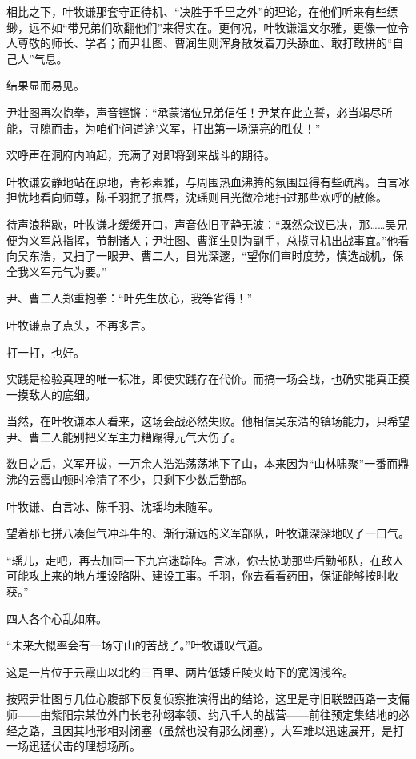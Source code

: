 相比之下，叶牧谦那套守正待机、“决胜于千里之外”的理论，在他们听来有些缥缈，远不如“带兄弟们砍翻他们”来得实在。更何况，叶牧谦温文尔雅，更像一位令人尊敬的师长、学者；而尹壮图、曹润生则浑身散发着刀头舔血、敢打敢拼的“自己人”气息。

结果显而易见。

尹壮图再次抱拳，声音铿锵：“承蒙诸位兄弟信任！尹某在此立誓，必当竭尽所能，寻隙而击，为咱们‘问道途’义军，打出第一场漂亮的胜仗！”

欢呼声在洞府内响起，充满了对即将到来战斗的期待。

叶牧谦安静地站在原地，青衫素雅，与周围热血沸腾的氛围显得有些疏离。白言冰担忧地看向师尊，陈千羽抿了抿唇，沈瑶则目光微冷地扫过那些欢呼的散修。

待声浪稍歇，叶牧谦才缓缓开口，声音依旧平静无波：“既然众议已决，那……吴兄便为义军总指挥，节制诸人；尹壮图、曹润生则为副手，总揽寻机出战事宜。”他看向吴东浩，又扫了一眼尹、曹二人，目光深邃，“望你们审时度势，慎选战机，保全我义军元气为要。”

尹、曹二人郑重抱拳：“叶先生放心，我等省得！”

叶牧谦点了点头，不再多言。

打一打，也好。

实践是检验真理的唯一标准，即使实践存在代价。而搞一场会战，也确实能真正摸一摸敌人的底细。

当然，在叶牧谦本人看来，这场会战必然失败。他相信吴东浩的镇场能力，只希望尹、曹二人能别把义军主力糟蹋得元气大伤了。

\vspace{2em}

数日之后，义军开拔，一万余人浩浩荡荡地下了山，本来因为“山林啸聚”一番而鼎沸的云霞山顿时冷清了不少，只剩下少数后勤部。

叶牧谦、白言冰、陈千羽、沈瑶均未随军。

望着那七拼八凑但气冲斗牛的、渐行渐远的义军部队，叶牧谦深深地叹了一口气。

“瑶儿，走吧，再去加固一下九宫迷踪阵。言冰，你去协助那些后勤部队，在敌人可能攻上来的地方埋设陷阱、建设工事。千羽，你去看看药田，保证能够按时收获。”

四人各个心乱如麻。

“未来大概率会有一场守山的苦战了。”叶牧谦叹气道。

\vspace{2em}

这是一片位于云霞山以北约三百里、两片低矮丘陵夹峙下的宽阔浅谷。

按照尹壮图与几位心腹部下反复侦察推演得出的结论，这里是守旧联盟西路一支偏师——由紫阳宗某位外门长老孙翊率领、约八千人的战营——前往预定集结地的必经之路，且因其地形相对闭塞（虽然也没有那么闭塞），大军难以迅速展开，是打一场迅猛伏击的理想场所。

